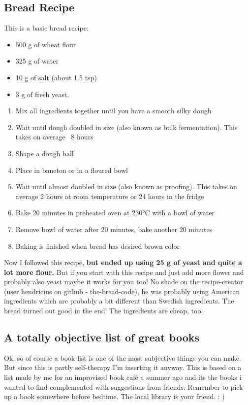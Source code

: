 \documentclass{article}
\begin{document}
\subsection*{Bread Recipe}
This is a basic bread recipe:
\begin{itemize}
  \item 500 g of wheat flour
  \item 325 g of water
  \item 10 g of salt (about 1.5 tsp)
  \item 3 g of fresh yeast.
\end{itemize}
 \begin{enumerate}
    \item Mix all ingredients together until you have a smooth silky dough    
    \item Wait until dough doubled in size (also known as bulk fermentation). This takes on average ~8 hours
    \item Shape a dough ball
    \item Place in baneton or in a floured bowl
    \item Wait until almost doubled in size (also known as proofing). This takes on
      average 2 hours at room temperature or 24 hours in the fridge
    \item Bake 20 minutes in preheated oven at 230°C with a bowl of water
    \item Remove bowl of water after 20 minutes, bake another 20 minutes
    \item Baking is finished when bread has desired brown color
\end{enumerate}
    Now I followed this recipe, \textbf{but ended up using 25 g of yeast and quite a lot more flour.} But if you start with this recipe and just add more flower and probably also yeast maybe it works for you too! No shade on the recipe-creator (user hendricius on github - the-bread-code), he was probably using American ingredients
    which are probably a bit different than Swedish ingredients. The bread turned out good in the end! 
    The ingredients are cheap, too.
    
\newpage
\subsection*{A totally objective list of great books}
Ok, so of course a book-list is one of the most subjective things you can make. But since this is partly self-therapy I'm inserting it anyway.
This is based on a list made by me for an improvised book café a summer ago and its the books i wanted to find complemented with suggestions from friends.
Remember to pick up a book somewhere before bedtime. The local library is your friend. : ) 
\end{document}
